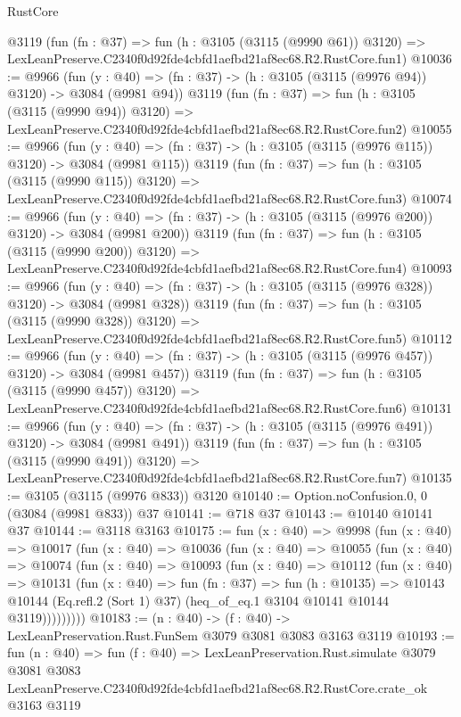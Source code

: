 \begin{lexlean}{RustCore}
\begin{coremodule}
    @3119
    (fun (fn : @37) =>
    fun (h : @3105 (@3115 (@9990 @61)) @3120) =>
    LexLeanPreserve.C2340f0d92fde4cbfd1aefbd21af8ec68.R2.RustCore.fun1)
@10036 := @9966
    (fun (y : @40) => (fn : @37) -> (h : @3105 (@3115 (@9976 @94)) @3120) -> @3084 (@9981 @94))
    @3119
    (fun (fn : @37) =>
    fun (h : @3105 (@3115 (@9990 @94)) @3120) =>
    LexLeanPreserve.C2340f0d92fde4cbfd1aefbd21af8ec68.R2.RustCore.fun2)
@10055 := @9966
    (fun (y : @40) => (fn : @37) -> (h : @3105 (@3115 (@9976 @115)) @3120) -> @3084 (@9981 @115))
    @3119
    (fun (fn : @37) =>
    fun (h : @3105 (@3115 (@9990 @115)) @3120) =>
    LexLeanPreserve.C2340f0d92fde4cbfd1aefbd21af8ec68.R2.RustCore.fun3)
@10074 := @9966
    (fun (y : @40) => (fn : @37) -> (h : @3105 (@3115 (@9976 @200)) @3120) -> @3084 (@9981 @200))
    @3119
    (fun (fn : @37) =>
    fun (h : @3105 (@3115 (@9990 @200)) @3120) =>
    LexLeanPreserve.C2340f0d92fde4cbfd1aefbd21af8ec68.R2.RustCore.fun4)
@10093 := @9966
    (fun (y : @40) => (fn : @37) -> (h : @3105 (@3115 (@9976 @328)) @3120) -> @3084 (@9981 @328))
    @3119
    (fun (fn : @37) =>
    fun (h : @3105 (@3115 (@9990 @328)) @3120) =>
    LexLeanPreserve.C2340f0d92fde4cbfd1aefbd21af8ec68.R2.RustCore.fun5)
@10112 := @9966
    (fun (y : @40) => (fn : @37) -> (h : @3105 (@3115 (@9976 @457)) @3120) -> @3084 (@9981 @457))
    @3119
    (fun (fn : @37) =>
    fun (h : @3105 (@3115 (@9990 @457)) @3120) =>
    LexLeanPreserve.C2340f0d92fde4cbfd1aefbd21af8ec68.R2.RustCore.fun6)
@10131 := @9966
    (fun (y : @40) => (fn : @37) -> (h : @3105 (@3115 (@9976 @491)) @3120) -> @3084 (@9981 @491))
    @3119
    (fun (fn : @37) =>
    fun (h : @3105 (@3115 (@9990 @491)) @3120) =>
    LexLeanPreserve.C2340f0d92fde4cbfd1aefbd21af8ec68.R2.RustCore.fun7)
@10135 := @3105 (@3115 (@9976 @833)) @3120
@10140 := Option.noConfusion.{0, 0} (@3084 (@9981 @833)) @37
@10141 := @718 @37
@10143 := @10140 @10141 @37
@10144 := @3118 @3163
@10175 := fun (x : @40) =>
  @9998
    (fun (x : @40) =>
    @10017
      (fun (x : @40) =>
      @10036
        (fun (x : @40) =>
        @10055
          (fun (x : @40) =>
          @10074
            (fun (x : @40) =>
            @10093
              (fun (x : @40) =>
              @10112
                (fun (x : @40) =>
                @10131
                  (fun (x : @40) =>
                  fun (fn : @37) =>
                  fun (h : @10135) =>
                  @10143
                    @10144
                    (Eq.refl.{2} (Sort 1) @37)
                    (heq_of_eq.{1} @3104 @10141 @10144 @3119)))))))))
@10183 := (n : @40) -> (f : @40) -> LexLeanPreservation.Rust.FunSem @3079 @3081 @3083 @3163 @3119
@10193 := fun (n : @40) =>
  fun (f : @40) =>
  LexLeanPreservation.Rust.simulate
    @3079
    @3081
    @3083
    LexLeanPreserve.C2340f0d92fde4cbfd1aefbd21af8ec68.R2.RustCore.crate_ok
    @3163
    @3119
\end{coremodule}
\end{lexlean}
